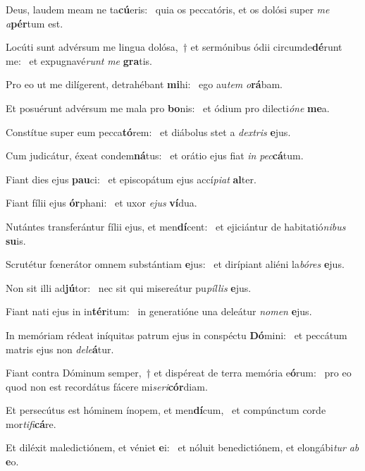 \item Deus, laudem meam ne ta\textbf{cú}eris:~\psstar{} quia os peccatóris, et os dolósi super \textit{me} \textit{a}\textbf{pér}tum est.
\item Locúti sunt advérsum me lingua dolósa,~† et sermónibus ódii circumde\textbf{dé}runt me:~\psstar{} et expugnavé\textit{runt} \textit{me} \textbf{gra}tis.
\item Pro eo ut me dilígerent, detrahébant \textbf{mi}hi:~\psstar{} ego au\textit{tem} \textit{o}\textbf{rá}bam.
\item Et posuérunt advérsum me mala pro \textbf{bo}nis:~\psstar{} et ódium pro dilecti\textit{óne} \textbf{me}a.
\item Constítue super eum pecca\textbf{tó}rem:~\psstar{} et diábolus stet a \textit{dextris} \textbf{e}jus.
\item Cum judicátur, éxeat condem\textbf{ná}tus:~\psstar{} et orátio ejus fiat \textit{in} \textit{pec}\textbf{cá}tum.
\item Fiant dies ejus \textbf{pau}ci:~\psstar{} et episcopátum ejus accí\textit{piat} \textbf{al}ter.
\item Fiant fílii ejus \textbf{ór}phani:~\psstar{} et uxor \textit{ejus} \textbf{ví}dua.
\item Nutántes transferántur fílii ejus, et men\textbf{dí}cent:~\psstar{} et ejiciántur de habitatió\textit{nibus} \textbf{su}is.
\item Scrutétur fœnerátor omnem substántiam \textbf{e}jus:~\psstar{} et dirípiant aliéni la\textit{bóres} \textbf{e}jus.
\item Non sit illi ad\textbf{jú}tor:~\psstar{} nec sit qui misereátur pu\textit{píllis} \textbf{e}jus.
\item Fiant nati ejus in in\textbf{tér}itum:~\psstar{} in generatióne una deleátur \textit{nomen} \textbf{e}jus.
\item In memóriam rédeat iníquitas patrum ejus in conspéctu \textbf{Dó}mini:~\psstar{} et peccátum matris ejus non \textit{dele}\textbf{á}tur.
\item Fiant contra Dóminum semper,~† et dispéreat de terra memória e\textbf{ó}rum:~\psstar{} pro eo quod non est recordátus fácere mi\textit{seri}\textbf{cór}diam.
\item Et persecútus est hóminem ínopem, et men\textbf{dí}cum,~\psstar{} et compúnctum corde mor\textit{tifi}\textbf{cá}re.
\item Et diléxit maledictiónem, et véniet \textbf{e}i:~\psstar{} et nóluit benedictiónem, et elongábi\textit{tur} \textit{ab} \textbf{e}o.

